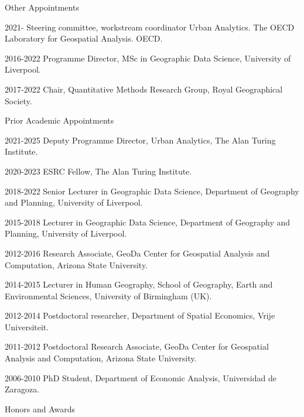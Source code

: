 \documentclass[12pt,2up]{article}
\begin{document}
\begin{cv}{}
\begin{cvlist}{Other Appointments}
\item[2021-] Steering committee, workstream coordinator Urban Analytics. The OECD
    Laboratory for Geospatial Analysis. OECD.
\item[2016-2022] Programme Director, MSc in Geographic Data Science, University
of Liverpool.
\item[2017-2022] Chair, Quantitative Methods Research Group, Royal
    Geographical Society.
\end{cvlist}

   \begin{cvlist}{Prior Academic Appointments}


 \item[2021-2025] Deputy Programme Director, Urban Analytics, The Alan Turing Institute.
 \item[2020-2023] ESRC Fellow, The Alan Turing Institute.
 \item[2018-2022] Senior Lecturer in Geographic Data Science, Department of Geography and
     Planning, University of Liverpool.
  \item[2015-2018] Lecturer in Geographic Data Science, Department of Geography and
     Planning, University of Liverpool.
\item[2012-2016] Research Associate, GeoDa Center for Geospatial Analysis
    and Computation, Arizona State University.

 \item[2014-2015] Lecturer in Human Geography, School of Geography, Earth and
     Environmental Sciences, University of Birmingham (UK).

 \item[2012-2014] Postdoctoral researcher, Department of Spatial Economics, Vrije Universiteit.

 \item[2011-2012] Postdoctoral Research Associate, GeoDa Center for Geospatial Analysis
    and Computation, Arizona State University.

\item[2006-2010] PhD Student, Department of Economic Analysis, Universidad de
    Zaragoza.

  \end{cvlist}

\begin{cvlist}{Honors and Awards}


\end{cvlist}
\end{cv}
\end{document}
